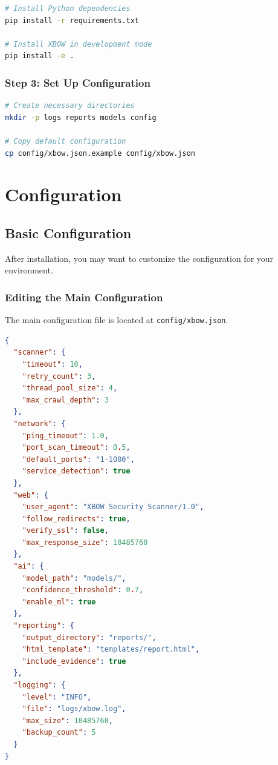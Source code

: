 \documentclass[12pt,a4paper]{report}
\begin{document}
\begin{lstlisting}[language=bash]
# Install Python dependencies
pip install -r requirements.txt

# Install XBOW in development mode
pip install -e .
\end{lstlisting}

\subsubsection{Step 3: Set Up Configuration}

\begin{lstlisting}[language=bash]
# Create necessary directories
mkdir -p logs reports models config

# Copy default configuration
cp config/xbow.json.example config/xbow.json
\end{lstlisting}

\section{Configuration}

\subsection{Basic Configuration}

After installation, you may want to customize the configuration for your environment.

\subsubsection{Editing the Main Configuration}

The main configuration file is located at \texttt{config/xbow.json}.

\begin{lstlisting}[language=json]
{
  "scanner": {
    "timeout": 10,
    "retry_count": 3,
    "thread_pool_size": 4,
    "max_crawl_depth": 3
  },
  "network": {
    "ping_timeout": 1.0,
    "port_scan_timeout": 0.5,
    "default_ports": "1-1000",
    "service_detection": true
  },
  "web": {
    "user_agent": "XBOW Security Scanner/1.0",
    "follow_redirects": true,
    "verify_ssl": false,
    "max_response_size": 10485760
  },
  "ai": {
    "model_path": "models/",
    "confidence_threshold": 0.7,
    "enable_ml": true
  },
  "reporting": {
    "output_directory": "reports/",
    "html_template": "templates/report.html",
    "include_evidence": true
  },
  "logging": {
    "level": "INFO",
    "file": "logs/xbow.log",
    "max_size": 10485760,
    "backup_count": 5
  }
}
\end{lstlisting}
\end{document}

